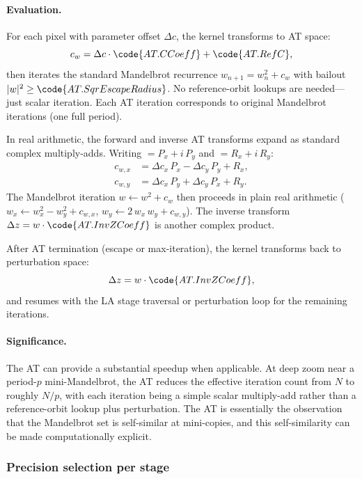 \paragraph{Evaluation.}
For each pixel with parameter offset \(\Delta c\), the kernel transforms
to AT space:
\[
c_w = \Delta c \cdot \code{AT.CCoeff} + \code{AT.RefC},
\]
then iterates the standard Mandelbrot recurrence
\(w_{n+1} = w_n^2 + c_w\) with bailout
\(|w|^2 \ge \code{AT.SqrEscapeRadius}\).  No reference-orbit
lookups are needed---just scalar iteration.  Each AT iteration corresponds
to  original Mandelbrot iterations (one full period).

In real arithmetic, the forward and inverse AT transforms expand as standard
complex multiply-adds.  Writing  $= P_x + i\,P_y$ and
 $= R_x + i\,R_y$:
\begin{align}
c_{w,x} &= \Delta c_x\,P_x - \Delta c_y\,P_y + R_x, \\
c_{w,y} &= \Delta c_x\,P_y + \Delta c_y\,P_x + R_y.
\end{align}
The Mandelbrot iteration $w \leftarrow w^2 + c_w$ then proceeds in
plain real arithmetic ($w_x \leftarrow w_x^2 - w_y^2 + c_{w,x}$,
$w_y \leftarrow 2\,w_x\,w_y + c_{w,y}$).  The inverse transform
$\Delta z = w \cdot \code{AT.InvZCoeff}$ is another complex product.

After AT termination (escape or max-iteration), the kernel transforms
back to perturbation space:
\[
\Delta z = w \cdot \code{AT.InvZCoeff},
\]
and resumes with the LA stage traversal or perturbation loop for the
remaining iterations.

\paragraph{Significance.}
The AT can provide a substantial speedup when applicable.  At deep zoom near
a period-\(p\) mini-Mandelbrot, the AT reduces the effective iteration
count from \(N\) to roughly \(N/p\), with each iteration being a simple
scalar multiply-add rather than a reference-orbit lookup plus
perturbation.  The AT is essentially the observation that the
Mandelbrot set is self-similar at mini-copies, and this self-similarity
can be made computationally explicit.

\subsubsection{Precision selection per stage}
\label{sec:la-dp-conversion}

